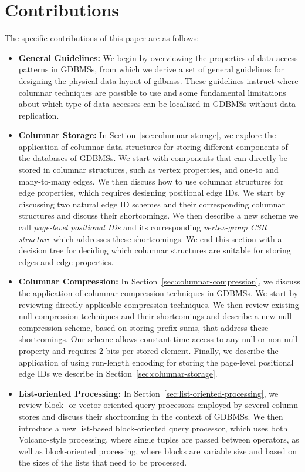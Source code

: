 \section{Contributions}

The specific contributions of this paper are as follows:

\begin{itemize}
	\item {\bf General Guidelines:} We begin by overviewing the properties of data access patterns in GDBMSs, from which we derive a set of general guidelines for designing the physical data layout of \gls{gdbms}s. These guidelines instruct where columnar techniques are possible to use and some fundamental limitations about which type of data accesses can be localized in GDBMSs without data replication.
		
	\item {\bf Columnar Storage:} In Section~\ref{sec:columnar-storage}, we explore  the application of columnar data structures for storing different components of the databases of GDBMSs. We start with components that can directly be stored in columnar structures, such as vertex properties, and one-to and many-to-many edges. We then discuss how to use columnar structures for edge properties, which requires designing positional edge IDs. We start by discussing two natural edge ID schemes and their corresponding columnar structures and discuss their shortcomings. We then describe a new scheme we call {\em page-level positional IDs} and its corresponding {\em vertex-group CSR structure} which addresses these shortcomings. We end this section with a decision tree for deciding which columnar structures are suitable for storing edges and edge properties.  
	\item {\bf Columnar Compression:} In Section~\ref{sec:columnar-compression}, we discuss the application of columnar compression techniques in GDBMSs. We start by reviewing directly applicable compression techniques. We then review existing null compression techniques and their shortcomings and describe a new null compression scheme, based on storing prefix sums, that address these shortcomings. Our scheme allows constant time access to any null or non-null property and requires 2 bits per stored element. Finally, we describe the application of using run-length encoding for storing the page-level positional edge IDs we describe in Section~\ref{sec:columnar-storage}. 
	\item {\bf List-oriented Processing:} In Section~\ref{sec:list-oriented-processing}, we review block- or vector-oriented query processors employed by several column stores and discuss their shortcoming in the context of GDBMSs. We then introduce a new list-based block-oriented query processor, which uses both Volcano-style processing, where single tuples are passed between operators, as well as block-oriented processing, where blocks are variable size and based on the sizes of the lists that need to be processed. 
	

\end{itemize}
